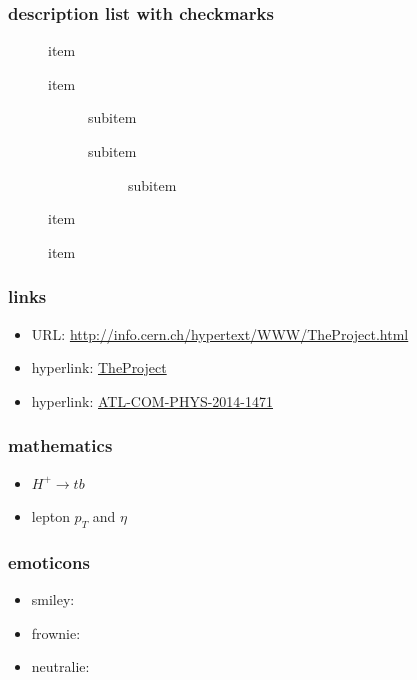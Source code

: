 
\begin{frame}
\frametitle{description list with checkmarks}
\begin{description}
\item[\Checkmark] item
\item[\Checkmark] item
    \begin{description}
    \item[\Checkmark] subitem
    \item[\Checkmark] subitem
        \begin{description}
        \item[\Checkmark] subitem
        \end{description}
    \end{description}
\item[\Checkmark] item
\item[\XSolidBrush] item
\end{description}
\end{frame}

\begin{frame}
\frametitle{links}
\begin{itemize}
\item URL: \url{http://info.cern.ch/hypertext/WWW/TheProject.html}
\item hyperlink: \href{http://info.cern.ch/hypertext/WWW/TheProject.html}{TheProject}
\item hyperlink: \href{https://cds.cern.ch/record/1969527}{ATL-COM-PHYS-2014-1471}
\end{itemize}
\end{frame}

\begin{frame}
\frametitle{mathematics}
\begin{itemize}
\item ${H^{+}\to tb}$
\item lepton ${p_{T}}$ and ${\eta}$
\end{itemize}
\end{frame}

\begin{frame}
\frametitle{emoticons}
\begin{itemize}
\item smiley: \smiley
\item frownie: \frownie
\item neutralie: \neutralie
\end{itemize}
\end{frame}

